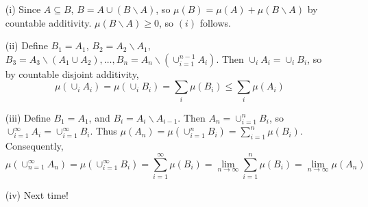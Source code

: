 \documentclass[x11names,reqno,14pt]{extarticle}
\newcommand*{\oo}{\infty}
\begin{document}
\proof
\begin{enumerate}
\item[(i)] Since $A \subseteq B$, $B = A \cup (B\backslash A)$, so $\mu(B) = \mu(A) + \mu(B\backslash A)$ by countable additivity. $\mu(B\backslash A) \geq 0$, so $(i)$ follows. 
\item[(ii)] Define $B_1 = A_1$, $B_2 = A_2 \backslash A_1$, $B_3 = A_3 \backslash (A_1 \cup A_2), \dots, B_n = A_n\backslash(\cup_{i=1}^{n - 1}A_i)$.
Then $\cup_i A_i = \cup_i B_i$, so by countable disjoint additivity, 
\[
\mu(\cup_i A_i) = \mu(\cup_i B_i) = \sum_i\mu(B_i) \leq \sum_i\mu(A_i)
\]
\item[(iii)] Define $B_1 = A_1$, and $B_i = A_i \backslash A_{i - 1}$. Then $A_n = \cup_{i=1}^nB_i$, so $\cup_{i=1}^\oo A_i= \cup_{i=1}^\oo B_i$. Thus $\mu(A_n) = \mu(\cup_{i=1}^nB_i) = \sum_{i=1}^n\mu(B_i)$. Consequently, 
\[
\mu(\cup_{n=1}^\oo A_n) = \mu(\cup_{i=1}^\oo B_i) = \sum_{i=1}^\oo\mu(B_i) = \lim_{n\to\oo}\sum_{i=1}^n\mu(B_i) = \lim_{n\to\oo}\mu(A_n)
\]
\item[(iv)] Next time!
\end{enumerate}













 

 
\end{document}
